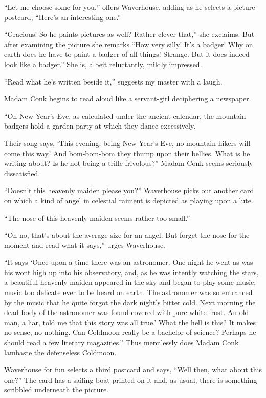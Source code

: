 \documentclass{book}
\begin{document}
``Let me choose some for you,'' offers Waverhouse, adding as he selects
a picture postcard, ``Here's an interesting one.''

``Gracious! So he paints pictures as well? Rather clever that,'' she
exclaims. But after examining the picture she remarks ``How very silly!
It's a badger! Why on earth does he have to paint a badger of all
things! Strange. But it does indeed look like a badger.'' She is, albeit
reluctantly, mildly impressed.

``Read what he's written beside it,'' suggests my master with a laugh.

Madam Conk begins to read aloud like a servant-girl deciphering a
newspaper.

``On New Year's Eve, as calculated under the ancient calendar, the
mountain badgers hold a garden party at which they dance excessively.

Their song says, `This evening, being New Year's Eve, no mountain hikers
will come this way.' And bom-bom-bom they thump upon their bellies. What
is he writing about? Is he not being a trifle frivolous?'' Madam Conk
seems seriously dissatisfied.

``Doesn't this heavenly maiden please you?'' Waverhouse picks out
another card on which a kind of angel in celestial raiment is depicted
as playing upon a lute.

``The nose of this heavenly maiden seems rather too small.''

``Oh no, that's about the average size for an angel. But forget the nose
for the moment and read what it says,'' urges Waverhouse.

``It says `Once upon a time there was an astronomer. One night he went
as was his wont high up into his observatory, and, as he was intently
watching the stars, a beautiful heavenly maiden appeared in the sky and
began to play some music; music too delicate ever to be heard on earth.
The astronomer was so entranced by the music that he quite forgot the
dark night's bitter cold. Next morning the dead body of the astronomer
was found covered with pure white frost. An old man, a liar, told me
that this story was all true.' What the hell is this? It makes no sense,
no nothing. Can Coldmoon really be a bachelor of science? Perhaps he
should read a few literary magazines.'' Thus mercilessly does Madam Conk
lambaste the defenseless Coldmoon.

Waverhouse for fun selects a third postcard and says, ``Well then, what
about this one?'' The card has a sailing boat printed on it and, as
usual, there is something scribbled underneath the picture.
\end{document}

